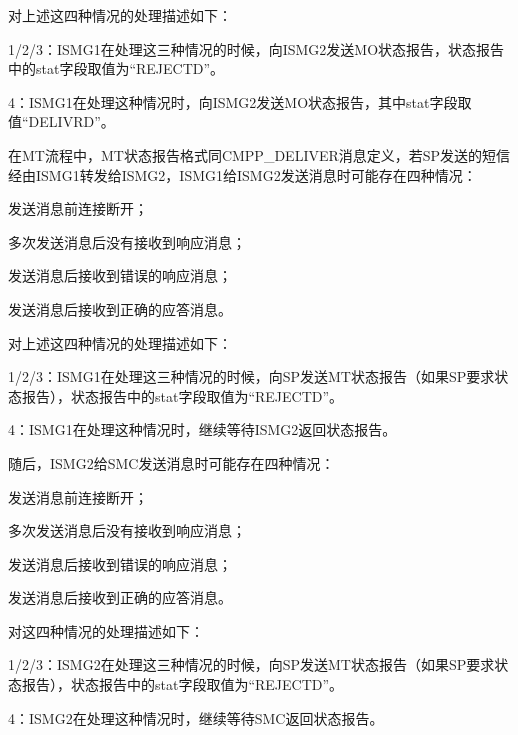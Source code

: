 \documentclass[11pt]{book} %
\begin{document}
对上述这四种情况的处理描述如下：

\begin{compactitem}
\item 1/2/3：ISMG1在处理这三种情况的时候，向ISMG2发送MO状态报告，状态报告中的stat字段取值为“REJECTD”。
\item 4：ISMG1在处理这种情况时，向ISMG2发送MO状态报告，其中stat字段取值“DELIVRD”。
\end{compactitem}


在MT流程中，MT状态报告格式同CMPP\_DELIVER消息定义，若SP发送的短信经由ISMG1转发给ISMG2，ISMG1给ISMG2发送消息时可能存在四种情况：

\begin{compactenum}
\item 发送消息前连接断开；
\item 多次发送消息后没有接收到响应消息；
\item 发送消息后接收到错误的响应消息；
\item 发送消息后接收到正确的应答消息。
\end{compactenum}


对上述这四种情况的处理描述如下：

\begin{compactitem}
\item 1/2/3：ISMG1在处理这三种情况的时候，向SP发送MT状态报告（如果SP要求状态报告），状态报告中的stat字段取值为“REJECTD”。
\item 4：ISMG1在处理这种情况时，继续等待ISMG2返回状态报告。
\end{compactitem}


随后，ISMG2给SMC发送消息时可能存在四种情况：

\begin{compactenum}
\item 发送消息前连接断开；
\item 多次发送消息后没有接收到响应消息；
\item 发送消息后接收到错误的响应消息；
\item 发送消息后接收到正确的应答消息。
\end{compactenum}


对这四种情况的处理描述如下：

\begin{compactitem}
\item 1/2/3：ISMG2在处理这三种情况的时候，向SP发送MT状态报告（如果SP要求状态报告），状态报告中的stat字段取值为“REJECTD”。
\item 4：ISMG2在处理这种情况时，继续等待SMC返回状态报告。
\end{compactitem}
\end{document}
